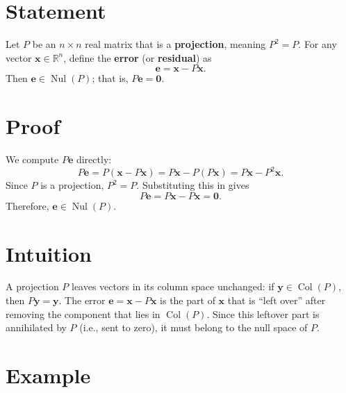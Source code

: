 \documentclass{article}
\begin{document}
\section*{Statement}

Let \( P \) be an \( n \times n \) real matrix that is a \textbf{projection}, meaning \( P^2 = P \).  
For any vector \( \mathbf{x} \in \mathbb{R}^n \), define the \textbf{error} (or \textbf{residual}) as
\[
\mathbf{e} = \mathbf{x} - P\mathbf{x}.
\]
Then \( \mathbf{e} \in \operatorname{Nul}(P) \); that is, \( P\mathbf{e} = \mathbf{0} \).

\section*{Proof}

We compute \( P\mathbf{e} \) directly:
\[
P\mathbf{e} = P(\mathbf{x} - P\mathbf{x}) = P\mathbf{x} - P(P\mathbf{x}) = P\mathbf{x} - P^2\mathbf{x}.
\]
Since \( P \) is a projection, \( P^2 = P \). Substituting this in gives
\[
P\mathbf{e} = P\mathbf{x} - P\mathbf{x} = \mathbf{0}.
\]
Therefore, \( \mathbf{e} \in \operatorname{Nul}(P) \).

\section*{Intuition}

A projection \( P \) leaves vectors in its column space unchanged: if \( \mathbf{y} \in \operatorname{Col}(P) \), then \( P\mathbf{y} = \mathbf{y} \).  
The error \( \mathbf{e} = \mathbf{x} - P\mathbf{x} \) is the part of \( \mathbf{x} \) that is ``left over'' after removing the component that lies in \( \operatorname{Col}(P) \).  
Since this leftover part is annihilated by \( P \) (i.e., sent to zero), it must belong to the null space of \( P \).

\section*{Example}
\end{document}
